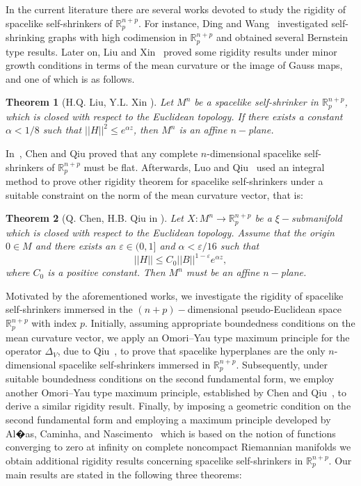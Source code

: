 \documentclass[leqno,11pt]{amsart}
\theoremstyle{plain}
\newtheorem{theorem}{\indent\sc Theorem}[section]
\theoremstyle{definition}
\numberwithin{equation}{section}
\begin{document}
In the current literature there are several works devoted to study the rigidity of spacelike self-shrinkers of $\mathbb{R}^{n+p}_{p}$. For instance, Ding and Wang~\cite{Ding-Wang:2010} investigated self-shrinking graphs with high codimension in $\mathbb{R}^{n+p}_{p}$ and obtained several Bernstein type results. Later on, Liu and Xin~\cite{Liu-Xin:2016} proved some rigidity results under minor growth conditions in terms of the mean curvature or the image of Gauss maps, and one of which is as follows.

\begin{theorem}[H.Q. Liu, Y.L. Xin \cite{Liu-Xin:2016}]
Let $M^n$ be a spacelike self-shrinker in $\mathbb{R}^{n+p}_p$, which is closed with respect to the Euclidean topology. If there exists a constant $\alpha < 1/8$ such that $||H||^2\leq e^{\alpha z}$, then $M^n$ is an affine $n-$plane.
\end{theorem}


In~\cite{QH:16}, Chen and Qiu proved that any complete $n$-dimensional spacelike self-shrinkers of $\mathbb{R}^{n+p}_{p}$ must be flat. Afterwards, Luo and Qiu~\cite{Luo-Qiu:2020} used an integral method to prove other rigidity theorem for spacelike self-shrinkers under a suitable constraint on the norm of the mean curvature vector, that is:

\begin{theorem}[Q. Chen, H.B. Qiu in \cite{QH:16}]
Let $X: M^n \longrightarrow \mathbb{R}^{n+p}_p$ be a $\xi-$submanifold which is closed	with respect to the Euclidean topology. Assume that the origin $0 \in M$ and there exists an $\varepsilon \in (0,1]$ and $\alpha < \varepsilon / 16$ such that 
$$
||H|| \leq C_ 0 ||B||^{1-\varepsilon} e^{\alpha z},
$$
where $C_0$ is a positive constant. Then $M^n$ must be an affine $n-$plane.
\end{theorem}


Motivated by the aforementioned works, we investigate the rigidity of spacelike self-shrinkers immersed in the $(n+p)-$dimensional pseudo-Euclidean space $\mathbb{R}^{n+p}_p$ with index $p$. Initially, assuming appropriate boundedness conditions on the mean curvature vector, we apply an Omori--Yau type maximum principle for the operator $\Delta_V$, due to Qiu~\cite{Qiu:2021}, to prove that spacelike hyperplanes are the only $n$-dimensional spacelike self-shrinkers immersed in $\mathbb{R}^{n+p}_p$. Subsequently, under suitable boundedness conditions on the second fundamental form, we employ another Omori--Yau type maximum principle, established by Chen and Qiu~\cite{QH:16}, to derive a similar rigidity result. Finally, by imposing a geometric condition on the second fundamental form and employing a maximum principle developed by Al�as, Caminha, and Nascimento~\cite{Alias-Caminha-Nascimento:2019} which is based on the notion of functions converging to zero at infinity on complete noncompact Riemannian manifolds we obtain additional rigidity results concerning spacelike self-shrinkers in $\mathbb{R}^{n+p}_p$. Our main results are stated in the following three theorems:
\end{document}
